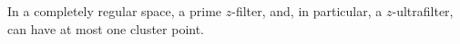 In a completely regular space, a prime $z$-filter, and, in particular, a $z$-ultrafilter, can have at most one cluster point.
